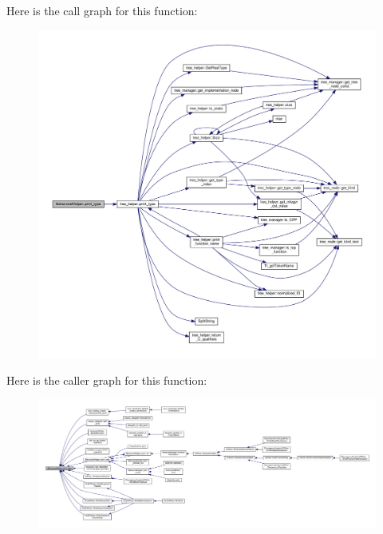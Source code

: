 Here is the call graph for this function\+:
\nopagebreak
\begin{figure}[H]
\begin{center}
\leavevmode
\includegraphics[width=350pt]{dd/db2/classBehavioralHelper_a1a794fe146a7a2b5ab204c4819b5d94e_cgraph}
\end{center}
\end{figure}
Here is the caller graph for this function\+:
\nopagebreak
\begin{figure}[H]
\begin{center}
\leavevmode
\includegraphics[width=350pt]{dd/db2/classBehavioralHelper_a1a794fe146a7a2b5ab204c4819b5d94e_icgraph}
\end{center}
\end{figure}
\mbox{\label{classBehavioralHelper_a9bf58062df2401ac3abb1fb4925a7d80}} 
